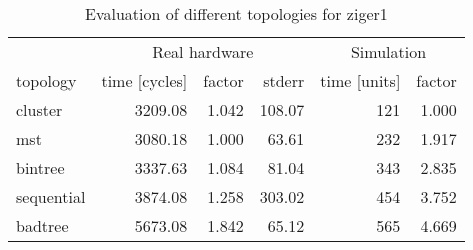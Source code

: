 \begin{table}[htb]
  \centering
  \begin{tabular}{lrrrrr}
  \toprule
  & \multicolumn{3}{c}{Real hardware} & \multicolumn{2}{c}{Simulation} \\
  topology & time [cycles] & factor & stderr & time [units] & factor \\
  \midrule
  cluster & 3209.08 & 1.042 & 108.07 & 121 & 1.000 \\
  mst & 3080.18 & 1.000 & 63.61 & 232 & 1.917 \\
  bintree & 3337.63 & 1.084 & 81.04 & 343 & 2.835 \\
  sequential & 3874.08 & 1.258 & 303.02 & 454 & 3.752 \\
  badtree & 5673.08 & 1.842 & 65.12 & 565 & 4.669 \\
  \midrule
  \end{tabular}
  \caption{Evaluation of different topologies for ziger1}
  \label{tab:ziger1}
\end{table}
